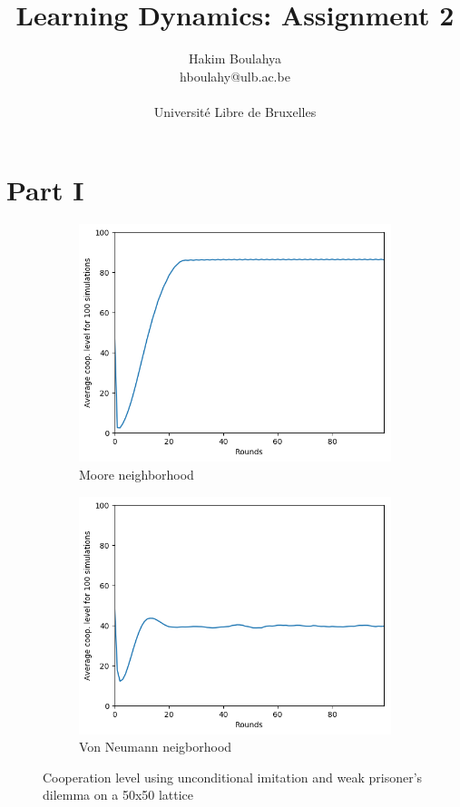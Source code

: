 \documentclass[letterpaper]{article}
\title{Learning Dynamics: Assignment 2}
\author{\Large Hakim Boulahya \\
hboulahy@ulb.ac.be\\
\\
Université Libre de Bruxelles
}
\begin{document}
\maketitle
\tableofcontents
\newpage
\section{Part I}



\begin{figure}
    \begin{subfigure}{.5\textwidth}
        \centering
        \includegraphics[width=1\linewidth]{images/assign2/50-part1}
        \caption{Moore neighborhood}
        \label{fig:50moorepart1}
    \end{subfigure}
    \begin{subfigure}{.5\textwidth}
        \centering
        \includegraphics[width=1\linewidth]{images/assign2/50_vonneumann-part1}
        \caption{Von Neumann neigborhood}
        \label{fig:50vonpart1}
    \end{subfigure}
    \caption{Cooperation level using unconditional imitation and
    weak prisoner's dilemma on a 50x50 lattice}
    \label{fig:50part1}
\end{figure}
\end{document}
